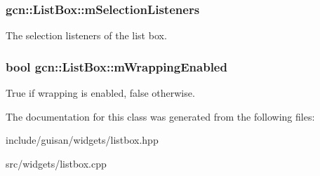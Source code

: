 \subsubsection[{\texorpdfstring{m\+Selection\+Listeners}{mSelectionListeners}}]{ gcn\+::\+List\+Box\+::m\+Selection\+Listeners\hspace{0.3cm}{\ttfamily [protected]}}\hypertarget{classgcn_1_1ListBox_a65f84e35f3d0a145a101b502b0cdc62e}{}\label{classgcn_1_1ListBox_a65f84e35f3d0a145a101b502b0cdc62e}
The selection listeners of the list box. 
\subsubsection[{\texorpdfstring{m\+Wrapping\+Enabled}{mWrappingEnabled}}]{\setlength{\rightskip}{0pt plus 5cm}bool gcn\+::\+List\+Box\+::m\+Wrapping\+Enabled\hspace{0.3cm}{\ttfamily [protected]}}\hypertarget{classgcn_1_1ListBox_ae1ea512562123a9b34b4d3c9f3312060}{}\label{classgcn_1_1ListBox_ae1ea512562123a9b34b4d3c9f3312060}
True if wrapping is enabled, false otherwise. 

The documentation for this class was generated from the following files\+:\begin{DoxyCompactItemize}
\item 
include/guisan/widgets/listbox.\+hpp\item 
src/widgets/listbox.\+cpp\end{DoxyCompactItemize}
